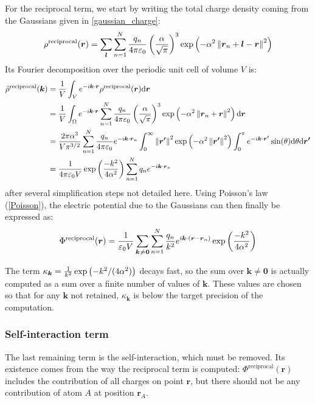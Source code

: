 \documentclass[main.tex]{subfiles}
\begin{document}
For the reciprocal term, we start by writing the total charge density coming from the Gaussians given in \autoref{gaussian_charge}:
\[\rho^\text{reciprocal}(\boldsymbol r) = \sum_{\boldsymbol l}\sum_{n=1}^N \frac{q_n}{4\pi\varepsilon_0}\left(\frac\alpha{\sqrt\pi}\right)^3\exp\left(-\alpha^2\left\|\boldsymbol r_n + \boldsymbol l - \boldsymbol r\right\|^2\right)\]
Its Fourier decomposition over the periodic unit cell of volume $V$ is:
\[\begin{split}
\hat\rho^\text{reciprocal}(\boldsymbol k) &= \frac1V\int_V e^{-i\boldsymbol k\cdot\boldsymbol r} \rho^\text{reciprocal}(\boldsymbol r)\text d\boldsymbol r
\\&= \frac1V\int_\Omega e^{-i\boldsymbol k\cdot\boldsymbol r} \sum_{n=1}^N \frac{q_n}{4\pi\varepsilon_0} \left(\frac\alpha{\sqrt\pi}\right)^3\exp\left(-\alpha^2\left\|\boldsymbol r_n + \boldsymbol r\right\|^2\right) \text d\boldsymbol r
\\&= \frac{2\pi\alpha^3}{V\pi^{3/2}} \sum_{n=1}^N \frac{q_n}{4\pi\varepsilon_0} e^{-i\boldsymbol k\cdot\boldsymbol r_n} \int_0^\infty \left\|\boldsymbol{r'}\right\|^2\exp\left(-\alpha^2 \left\|\boldsymbol{r'}\right\|^2\right)\int_0^\pi e^{-i\boldsymbol k\cdot\boldsymbol{r'}} \sin(\theta) \text d \theta \text d \boldsymbol{r'}
\\&= \frac1{4\pi\varepsilon_0V}\exp\left(\frac{-k^2}{4\alpha^2}\right)\sum_{n=1}^N q_n e^{-i\boldsymbol k\cdot\boldsymbol r_n}\end{split}\]
after several simplification steps not detailed here. Using Poisson's law (\autoref{Poisson}), the electric potential due to the Gaussians can then finally be expressed as:
\[\Phi^\text{reciprocal}(\boldsymbol r) = \frac{1}{\varepsilon_0V}\sum_{\boldsymbol k\not\kern0.2ex= \boldsymbol 0}\sum_{n=1}^N \frac{q_n}{k^2} e^{i\boldsymbol k\cdot\left(\boldsymbol r - \boldsymbol r_n\right)}\exp\left(\frac{-k^2}{4\alpha^2}\right)\label{eq:reciprocal}\]

The term $\kappa_{\boldsymbol{k}} = \frac1{k^2}\exp\left(-k^2/(4\alpha^2)\right)$ decays fast, so the sum over $\boldsymbol{k}\neq\boldsymbol{0}$ is actually computed as a sum over a finite number of values of $\boldsymbol{k}$. These values are chosen so that for any $\boldsymbol{k}$ not retained, $\kappa_{\boldsymbol{k}}$ is below the target precision of the computation.

\subsubsection{Self-interaction term}

The last remaining term is the self-interaction, which must be removed. Its existence comes from the way the reciprocal term is computed: $\Phi^\text{reciprocal}(\boldsymbol r)$ includes the contribution of all charges on point $\boldsymbol r$, but there should not be any contribution of atom $A$ at position $\boldsymbol r_A$.
\end{document}

